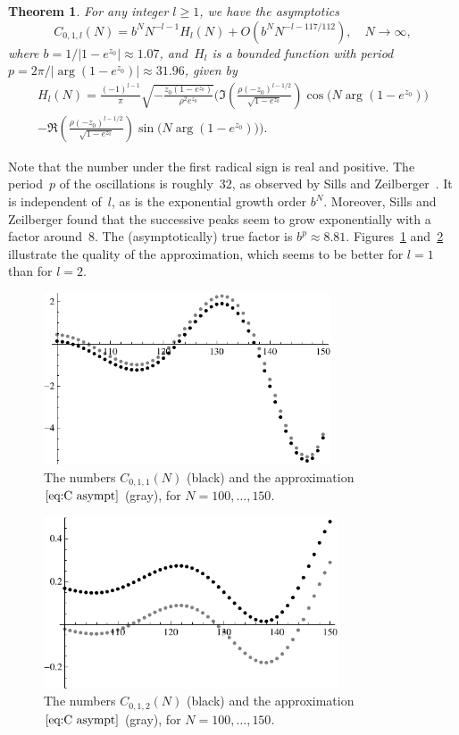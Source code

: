 \documentclass[a4paper]{amsart}
\newtheorem{theorem}{Theorem}
\begin{document}
\begin{theorem}\label{thm:main}
    For any integer $l\geq1$, we have the asymptotics
    \begin{equation}\label{eq:C asympt}
        C_{0,1,l}(N) = b^N N^{-l-1} H_l(N) + O(b^N N^{-l-117/112}), \quad N\to\infty, 
    \end{equation}
    where $b=1/|1-e^{z_0}|\approx 1.07$, and~$H_l$ is a bounded function with period
   $p=2\pi/|\arg(1-e^{z_0})|\approx 31.96$, given by
   \begin{multline*}
       H_l(N) = \frac{(-1)^{l-1}}{\pi} 
       \sqrt{-\frac {z_0(1-e^{z_0})}{\rho^2e^{z_0}}}
       \Bigg(\Im\left( \frac{\rho(-z_0)^{l-1/2}}{\sqrt{1-e^{z_0}}}\right)\cos\big(N \arg(1-e^{z_0})\big) \\
        -\Re\left(\frac{\rho(-z_0)^{l-1/2}}{\sqrt{1-e^{z_0}}}\right)\sin\big(N \arg(1-e^{z_0})\big)\Bigg).
   \end{multline*}
\end{theorem}
%
Note that the number under the first radical sign is real and positive.
The period~$p$
of the oscillations is roughly~$32$, as observed by Sills and
Zeilberger~\cite{SiZe13}. It is independent of~$l$, as is the
exponential growth order $b^N$. Moreover, Sills and Zeilberger
found that the successive peaks seem to grow exponentially with
a factor around~$8$. The (asymptotically) true factor
is $b^p\approx 8.81$.
Figures~\ref{fig:1} and~\ref{fig:2} illustrate the quality of the approximation,
which seems to be better for $l=1$ than for $l=2$.
%
\begin{figure}
\begin{center}
\includegraphics[height=2in]{fig1}
\end{center}
\caption{\label{fig:1}The numbers $C_{0,1,1}(N)$ (black)
and the approximation~$\ref{eq:C asympt}$ (gray), for
$N=100,\dots,150$.}
\end{figure}
%
\begin{figure}
\begin{center}
\includegraphics[height=2in]{fig2}
\end{center}
\caption{\label{fig:2}The numbers $C_{0,1,2}(N)$ (black)
and the approximation~$\ref{eq:C asympt}$ (gray), for
$N=100,\dots,150$.}
\end{figure}
\end{document}
